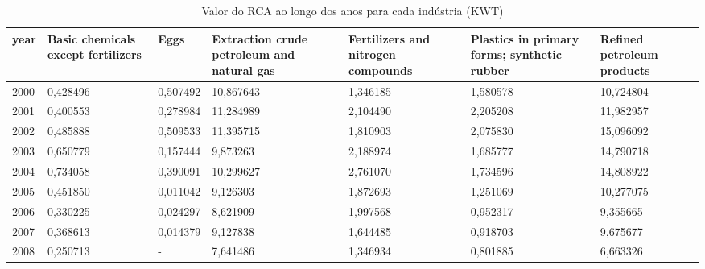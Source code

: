 \begin{table}
\centering
\caption{Valor do RCA ao longo dos anos para cada indústria (KWT)}
\begin{tabular}{p{1cm}p{2cm}p{2cm}p{2cm}p{2cm}p{2cm}p{2cm}}
\toprule
 year &  Basic chemicals except fertilizers &     Eggs &  Extraction crude petroleum and natural gas &  Fertilizers and nitrogen compounds &  Plastics in primary forms; synthetic rubber &  Refined petroleum products \\
\midrule
 2000 &                            0,428496 & 0,507492 &                                   10,867643 &                            1,346185 &                                     1,580578 &                   10,724804 \\
 2001 &                            0,400553 & 0,278984 &                                   11,284989 &                            2,104490 &                                     2,205208 &                   11,982957 \\
 2002 &                            0,485888 & 0,509533 &                                   11,395715 &                            1,810903 &                                     2,075830 &                   15,096092 \\
 2003 &                            0,650779 & 0,157444 &                                    9,873263 &                            2,188974 &                                     1,685777 &                   14,790718 \\
 2004 &                            0,734058 & 0,390091 &                                   10,299627 &                            2,761070 &                                     1,734596 &                   14,808922 \\
 2005 &                            0,451850 & 0,011042 &                                    9,126303 &                            1,872693 &                                     1,251069 &                   10,277075 \\
 2006 &                            0,330225 & 0,024297 &                                    8,621909 &                            1,997568 &                                     0,952317 &                    9,355665 \\
 2007 &                            0,368613 & 0,014379 &                                    9,127838 &                            1,644485 &                                     0,918703 &                    9,675677 \\
 2008 &                            0,250713 &        - &                                    7,641486 &                            1,346934 &                                     0,801885 &                    6,663326 \\

\end{tabular}
\end{table}
